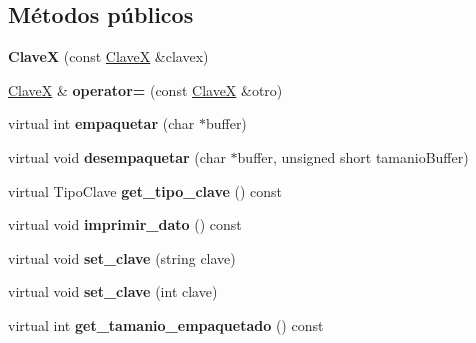 \subsection*{\-Métodos públicos}
\begin{DoxyCompactItemize}
\item 
\hypertarget{class_clave_x_afc6b1e6aa31f46f1e6809bbbab261ce1}{{\bfseries \-Clave\-X} (const \hyperlink{class_clave_x}{\-Clave\-X} \&clavex)}\label{class_clave_x_afc6b1e6aa31f46f1e6809bbbab261ce1}

\item 
\hypertarget{class_clave_x_afcbac027cc22bda9395c32333012140b}{\hyperlink{class_clave_x}{\-Clave\-X} \& {\bfseries operator=} (const \hyperlink{class_clave_x}{\-Clave\-X} \&otro)}\label{class_clave_x_afcbac027cc22bda9395c32333012140b}

\item 
\hypertarget{class_clave_x_a4f5f1a1e9c87c7c57aff97d7569d4b6a}{virtual int {\bfseries empaquetar} (char $\ast$buffer)}\label{class_clave_x_a4f5f1a1e9c87c7c57aff97d7569d4b6a}

\item 
\hypertarget{class_clave_x_ac6f836eea79ba6fb2e250ec306a0d6d1}{virtual void {\bfseries desempaquetar} (char $\ast$buffer, unsigned short tamanio\-Buffer)}\label{class_clave_x_ac6f836eea79ba6fb2e250ec306a0d6d1}

\item 
\hypertarget{class_clave_x_af8673851dcd34e4bcb8a3e3c7745a195}{virtual \-Tipo\-Clave {\bfseries get\-\_\-tipo\-\_\-clave} () const }\label{class_clave_x_af8673851dcd34e4bcb8a3e3c7745a195}

\item 
\hypertarget{class_clave_x_a7f040e8bc8a68af7a4a1d3baf3a5a3c2}{virtual void {\bfseries imprimir\-\_\-dato} () const }\label{class_clave_x_a7f040e8bc8a68af7a4a1d3baf3a5a3c2}

\item 
\hypertarget{class_clave_x_ad0ba2b06dbf2e57e9eab078dbe346bdf}{virtual void {\bfseries set\-\_\-clave} (string clave)}\label{class_clave_x_ad0ba2b06dbf2e57e9eab078dbe346bdf}

\item 
\hypertarget{class_clave_x_a1be00170b4a503768973db6956ea649a}{virtual void {\bfseries set\-\_\-clave} (int clave)}\label{class_clave_x_a1be00170b4a503768973db6956ea649a}

\item 
\hypertarget{class_clave_x_a2fedb7e8bb890b9c7fc6b88b78c3988a}{virtual int {\bfseries get\-\_\-tamanio\-\_\-empaquetado} () const }\label{class_clave_x_a2fedb7e8bb890b9c7fc6b88b78c3988a}


\end{DoxyCompactItemize}
